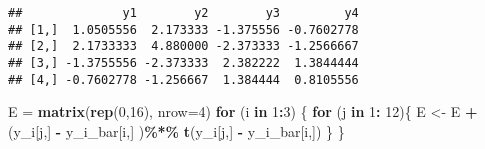 \documentclass[
]{article}
\newenvironment{Shaded}{\begin{snugshade}}{\end{snugshade}}
\newcommand{\AttributeTok}[1]{\textcolor[rgb]{0.13,0.29,0.53}{#1}}
\newcommand{\ControlFlowTok}[1]{\textcolor[rgb]{0.13,0.29,0.53}{\textbf{#1}}}
\newcommand{\DecValTok}[1]{\textcolor[rgb]{0.00,0.00,0.81}{#1}}
\newcommand{\FunctionTok}[1]{\textcolor[rgb]{0.13,0.29,0.53}{\textbf{#1}}}
\newcommand{\NormalTok}[1]{#1}
\newcommand{\OtherTok}[1]{\textcolor[rgb]{0.56,0.35,0.01}{#1}}
\newcommand{\SpecialCharTok}[1]{\textcolor[rgb]{0.81,0.36,0.00}{\textbf{#1}}}
\begin{document}
\begin{verbatim}
##              y1        y2        y3         y4
## [1,]  1.0505556  2.173333 -1.375556 -0.7602778
## [2,]  2.1733333  4.880000 -2.373333 -1.2566667
## [3,] -1.3755556 -2.373333  2.382222  1.3844444
## [4,] -0.7602778 -1.256667  1.384444  0.8105556
\end{verbatim}

\begin{Shaded}
\begin{Highlighting}[]
\NormalTok{E }\OtherTok{=} \FunctionTok{matrix}\NormalTok{(}\FunctionTok{rep}\NormalTok{(}\DecValTok{0}\NormalTok{,}\DecValTok{16}\NormalTok{), }\AttributeTok{nrow=}\DecValTok{4}\NormalTok{)}
\ControlFlowTok{for}\NormalTok{ (i }\ControlFlowTok{in} \DecValTok{1}\SpecialCharTok{:}\DecValTok{3}\NormalTok{) \{}
  \ControlFlowTok{for}\NormalTok{ (j }\ControlFlowTok{in} \DecValTok{1}\SpecialCharTok{:} \DecValTok{12}\NormalTok{)\{}
\NormalTok{E }\OtherTok{\textless{}{-}}\NormalTok{ E }\SpecialCharTok{+}\NormalTok{ (y\_i[j,] }\SpecialCharTok{{-}}\NormalTok{ y\_i\_bar[i,] )}\SpecialCharTok{\%*\%} \FunctionTok{t}\NormalTok{(y\_i[j,] }\SpecialCharTok{{-}}\NormalTok{ y\_i\_bar[i,])}
\NormalTok{\}}
\NormalTok{\}}
\end{Highlighting}
\end{Shaded}
\end{document}
